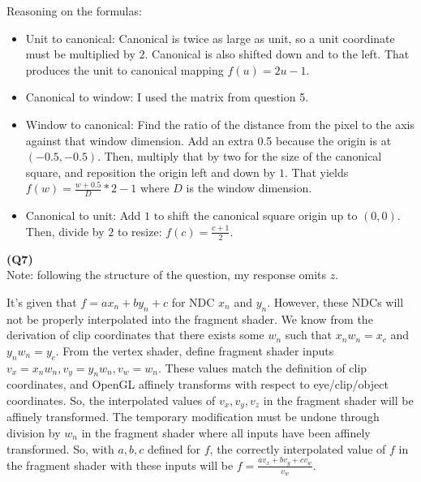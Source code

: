 \documentclass[letterpaper, 11pt]{article}
\begin{document}
\medskip
Reasoning on the formulas:
\begin{itemize}
  \item Unit to canonical: Canonical is twice as large as unit, so a unit coordinate must be multiplied by $2$. Canonical is also shifted down and to the left. That produces the unit to canonical mapping $f(u) = 2u - 1$.
  \item Canonical to window: I used the matrix from question 5.
  \item Window to canonical: Find the ratio of the distance from the pixel to the axis against that window dimension. Add an extra 0.5 because the origin is at $(-0.5, -0.5)$. Then, multiply that by two for the size of the canonical square, and reposition the origin left and down by $1$. That yields $f(w) = \frac{w + 0.5}{D} * 2 - 1$ where $D$ is the window dimension. 
  \item Canonical to unit: Add $1$ to shift the canonical square origin up to $(0, 0)$. Then, divide by $2$ to resize: $f(c) = \frac{c + 1}{2}$.
\end{itemize}

\medskip
\textbf{(Q7)} \\ 
Note: following the structure of the question, my response omits $z$. 

\medskip
It's given that $f = ax_n + by_n + c$ for NDC $x_n$ and $y_n$. However, these NDCs will not be properly interpolated into the fragment shader. We know from the derivation of clip coordinates that there exists some $w_n$ such that $x_nw_n = x_c$ and $y_nw_n = y_c$. From the vertex shader, define fragment shader inputs $v_x = x_nw_n, v_y = y_nw_n, v_w = w_n$. These values match the definition of clip coordinates, and OpenGL affinely transforms with respect to eye/clip/object coordinates. So, the interpolated values of $v_x, v_y, v_z$ in the fragment shader will be affinely transformed. The temporary modification must be undone through division by $w_n$ in the fragment shader where all inputs have been affinely transformed. So, with $a, b, c$ defined for $f$, the correctly interpolated value of $f$ in the fragment shader with these inputs will be $f = \frac{av_x + bv_y + cv_w}{v_w}$.
\end{document}
